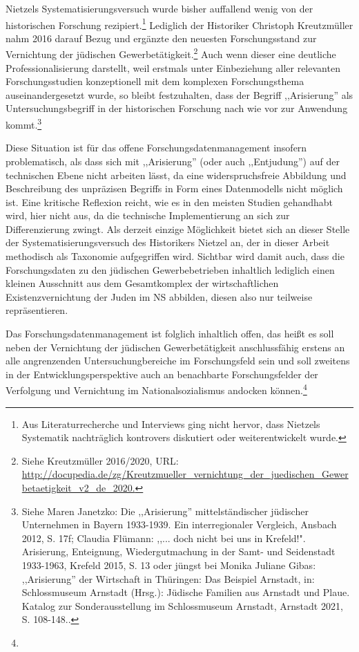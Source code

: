Nietzels Systematisierungsversuch wurde bisher auffallend wenig von der historischen Forschung rezipiert.\footnote{Aus Literaturrecherche und Interviews ging nicht hervor, dass Nietzels Systematik nachträglich kontrovers diskutiert oder weiterentwickelt wurde.} Lediglich der Historiker Christoph Kreutzmüller nahm 2016 darauf Bezug und ergänzte den neuesten Forschungsstand zur Vernichtung der jüdischen Gewerbetätigkeit.\footnote{Siehe Kreutzmüller 2016/2020,  URL: \url{http://docupedia.de/zg/Kreutzmueller_vernichtung_der_juedischen_Gewerbetaetigkeit_v2_de_2020.}} Auch wenn dieser eine deutliche Professionalisierung darstellt, weil erstmals unter Einbeziehung aller relevanten Forschungsstudien konzeptionell mit dem komplexen Forschungsthema auseinandergesetzt wurde, so bleibt festzuhalten, dass der Begriff ,,Arisierung'' als Untersuchungsbegriff in der historischen Forschung nach wie vor zur Anwendung kommt.\footnote{Siehe Maren Janetzko: Die ,,Arisierung'' mittelständischer jüdischer Unternehmen in Bayern 1933-1939. Ein interregionaler Vergleich, Ansbach 2012, S. 17f; Claudia Flümann: ,,... doch nicht bei uns in Krefeld!". Arisierung, Enteignung, Wiedergutmachung in der Samt- und Seidenstadt 1933-1963, Krefeld 2015, S. 13 oder jüngst bei Monika Juliane Gibas: ,,Arisierung'' der Wirtschaft in Thüringen: Das Beispiel Arnstadt, in: Schlossmuseum Arnstadt (Hrsg.): Jüdische Familien aus Arnstadt und Plaue. Katalog zur Sonderausstellung im Schlossmuseum Arnstadt, Arnstadt 2021, S. 108-148..} 

Diese Situation ist für das offene Forschungsdatenmanagement insofern problematisch, als dass sich mit ,,Arisierung'' (oder auch ,,Entjudung'') auf der technischen Ebene nicht arbeiten lässt, da eine widerspruchsfreie Abbildung und Beschreibung des unpräzisen Begriffs in Form eines Datenmodells nicht möglich ist. Eine kritische Reflexion reicht, wie es in den meisten Studien gehandhabt wird, hier nicht aus, da die technische Implementierung an sich zur Differenzierung zwingt. Als derzeit einzige Möglichkeit bietet sich an dieser Stelle der Systematisierungsversuch des Historikers Nietzel an, der in dieser Arbeit methodisch als Taxonomie aufgegriffen wird. Sichtbar wird damit auch, dass die Forschungsdaten zu den jüdischen Gewerbebetrieben inhaltlich lediglich einen kleinen Ausschnitt aus dem Gesamtkomplex der wirtschaftlichen Existenzvernichtung der Juden im NS abbilden, diesen also nur teilweise repräsentieren.

Das Forschungsdatenmanagement ist folglich inhaltlich offen, das heißt es soll neben der Vernichtung der jüdischen Gewerbetätigkeit anschlussfähig erstens an alle angrenzenden Untersuchungbereiche im Forschungsfeld sein und soll zweitens in der Entwicklungsperspektive auch an benachbarte Forschungsfelder der Verfolgung und Vernichtung im Nationalsozialismus andocken können.\footnote{} 

